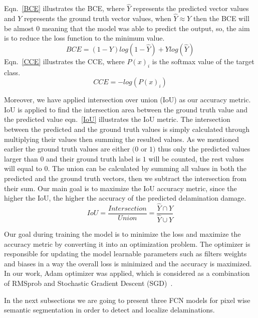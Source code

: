 \documentclass[preprint,9pt]{elsarticle}
\begin{document}
Eqn.~\ref{BCE} illustrates the BCE, where \(\hat{Y}\) represents the predicted vector values and \(Y\) represents the ground truth vector values, when \(\hat{Y} \approx Y\) then the BCE will be almost \(0\) meaning that the model was able to predict the output, so, the aim is to reduce the loss function to the minimum value.
\begin{equation}
	BCE = (1-Y)log(1-\hat{Y})+Ylog(\hat{Y})
	\label{BCE}
\end{equation}
Eqn.~\ref{CCE} illustrates the CCE, where \( P(x)_{i}\) is the softmax value of the target class. 
\begin{equation}
CCE = -log\left( P(x)_{i} \right)
\label{CCE}
\end{equation}

Moreover, we have applied intersection over union (IoU) as our accuracy metric. 
IoU is applied to find the intersection area between the ground truth value and the predicted value eqn.~\ref{IoU} illustrates the IoU metric.
The intersection between the predicted and the ground truth values is simply calculated through multiplying their values then summing the resulted values.
As we mentioned earlier the ground truth values are either \((0\) or \(1)\) thus only the predicted values larger than \(0\) and their ground truth label is \(1\) will be counted, the rest values will equal to \(0\). 
The union can be calculated by summing all values in both the predicted and the ground truth  vectors, then we subtract the intersection from their sum.
Our main goal is to maximize the IoU accuracy metric, since the higher the IoU, the higher the accuracy of the predicted delamination damage.
\begin{equation}
IoU = \frac{Intersection}{Union} = \frac{\hat{Y} \cap Y}{\hat{Y} \cup Y} 
\label{IoU}
\end{equation}

Our goal during training the model is to minimize the loss and maximize the accuracy metric by converting it into an optimization problem. 
The optimizer is responsible for updating the model learnable parameters such as filters weights and biases in a way the overall loss is minimized and the accuracy is maximized.
In our work, Adam optimizer was applied, which is considered as a combination of RMSprob and Stochastic Gradient Descent (SGD)~\cite{Kingma2015}. 

In the next subsections we are going to present three FCN models for pixel wise semantic segmentation in order to detect and localize delaminations.
\end{document}
